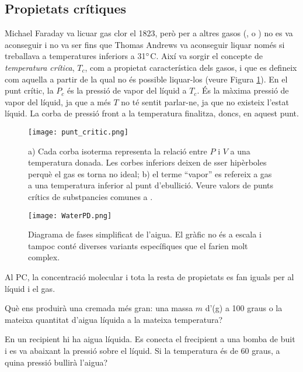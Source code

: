\subsection{Propietats crítiques}
\label{sec:PropietatsCritiques}

Michael Faraday va licuar gas clor el 1823, però per a altres gasos (,  o ) no es va aconseguir i no va ser fins que Thomas Andrews va aconseguir liquar  només si treballava a temperatures inferiors a 31$\degree$C. Així va sorgir el concepte de \emph{temperatura crítica}, $T_c$, com a propietat característica dels gasos, i que es defineix com aquella a partir de la qual no és possible liquar-los (veure Figura \ref{fig:punt_critic}).
En el punt crític, la $P_c$ és la pressió de vapor del líquid a $T_c$. És la màxima pressió de vapor del líquid, ja que a més $T$ no té sentit parlar-ne, ja que no existeix l'estat líquid. La corba de pressió front a la temperatura finalitza, doncs, en aquest punt.

\begin{figure}[h]
\centering
\texttt{[image: punt\_critic.png]}
\caption[Punt crític]{a) Cada corba isoterma representa la relació entre $P$ i $V$ a una temperatura donada. Les corbes inferiors deixen de sser hipèrboles perquè el gas es torna no ideal; b) el terme ``vapor'' es refereix a gas a una temperatura inferior al punt d'ebullició. Veure valors de punts crítics de substpancies comunes a .\cite{openstax_cnx_openstax_nodate}}
\label{fig:punt_critic}
\end{figure}


\begin{figure}[h]
\centering
\texttt{[image: WaterPD.png]}
\caption[Diagrama de fases simplificat de l'aigua]{Diagrama de fases simplificat de l'aigua. El gràfic no és a escala i tampoc conté diverses variants específiques que el farien molt complex.\cite{openstax_cnx_openstax_nodate}}
\label{fig:WaterPD}
\end{figure}
Al PC, la concentració molecular i tota la resta de propietats es fan iguals per al líquid i el gas.

\begin{exr}
Què ens produirà una cremada més gran: una massa $m$ d'(g) a 100 graus o la mateixa quantitat d'aigua líquida a la mateixa temperatura?
\end{exr}

\begin{exr}
En un recipient hi ha aigua líquida. Es conecta el frecipient a una bomba de buit i es va abaixant la pressió sobre el líquid. Si la temperatura és de 60 graus, a quina pressió bullirà l'aigua?
\end{exr}

